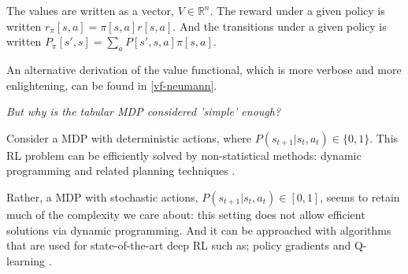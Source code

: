 The values are written as a vector, $V \in \mathbb R^n$.
The reward under a given policy is written $r_{\pi}[s, a] = \pi[s, a] r[s, a]$.
And the transitions under a given policy is written $P_{\pi}[s', s] = \sum_a P[s', s, a]\pi[s, a]$.

An alternative derivation of the value functional, which is more verbose and more enlightening, can be found in \ref{vf-neumann}.

\begin{displayquote}
\textsl{But why is the tabular MDP considered 'simple' enough?}
\end{displayquote}

Consider a MDP with deterministic actions, where $P(s_{t+1}|s_t, a_t) \in \{ 0, 1\}$.
This RL problem can be efficiently solved by non-statistical
methods: dynamic programming and related planning techniques \cite{Bertsekas1995}.

Rather, a MDP with stochastic actions, $P(s_{t+1}|s_t, a_t) \in [0, 1]$,
seems to retain much of the complexity we care about: this setting does not allow
efficient solutions via dynamic programming. And it can be approached with algorithms
that are used for state-of-the-art deep RL such as;
policy gradients \cite{Schulman2015a} and Q-learning \cite{Mnih2015}.

